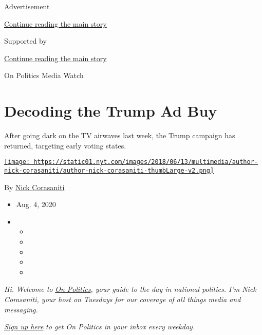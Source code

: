 Advertisement

\protect\hyperlink{after-top}{Continue reading the main story}

Supported by

\protect\hyperlink{after-sponsor}{Continue reading the main story}

On Politics Media Watch

\hypertarget{decoding-the-trump-ad-buy}{%
\section{Decoding the Trump Ad Buy}\label{decoding-the-trump-ad-buy}}

After going dark on the TV airwaves last week, the Trump campaign has
returned, targeting early voting states.

\href{https://www.nytimes.com/by/nick-corasaniti}{\texttt{[image: https://static01.nyt.com/images/2018/06/13/multimedia/author-nick-corasaniti/author-nick-corasaniti-thumbLarge-v2.png]}}

By \href{https://www.nytimes.com/by/nick-corasaniti}{Nick Corasaniti}

\begin{itemize}
\item
  Aug. 4, 2020
\item
  \begin{itemize}
  \item
  \item
  \item
  \item
  \item
  \end{itemize}
\end{itemize}

\emph{Hi. Welcome to}
\href{https://nl.nytimes.com/f/a/zarSo8aO-mBP32V6vtzLuw~~/AAAAAQA~/RgRfpIqEP0TSaHR0cHM6Ly93d3cubnl0aW1lcy5jb20vc3BvdGxpZ2h0L29uLXBvbGl0aWNzP3RlPTEmbmw9b24tcG9saXRpY3Mgd2l0aCBsaXNhIGxlcmVyJmVtYz1lZGl0X2NuXzIwMTkxMTA1P2NhbXBhaWduX2lkPTU2Jmluc3RhbmNlX2lkPTEzNjQxJnNlZ21lbnRfaWQ9MTg1NDcmdXNlcl9pZD1iNTA4ZWUwOTdhYWY0NWE5N2IxYmEwZTc5Y2QwNjg0ZSZyZWdpX2lkPTYzMjU0MTc0VwNueXRCCgAehAXCXTVeoxVSH25pY2hvbGFzLmNvcmFzYW5pdGlAbnl0aW1lcy5jb21YBAAAAAA~}{\emph{On
Politics}}\emph{, your guide to the day in national politics. I'm Nick
Corasaniti, your host on Tuesdays for our coverage of all things media
and messaging.}

\href{https://www.nytimes.com/newsletters/politics?module=inline}{\emph{Sign
up here}} \emph{to get On Politics in your inbox every weekday.}

